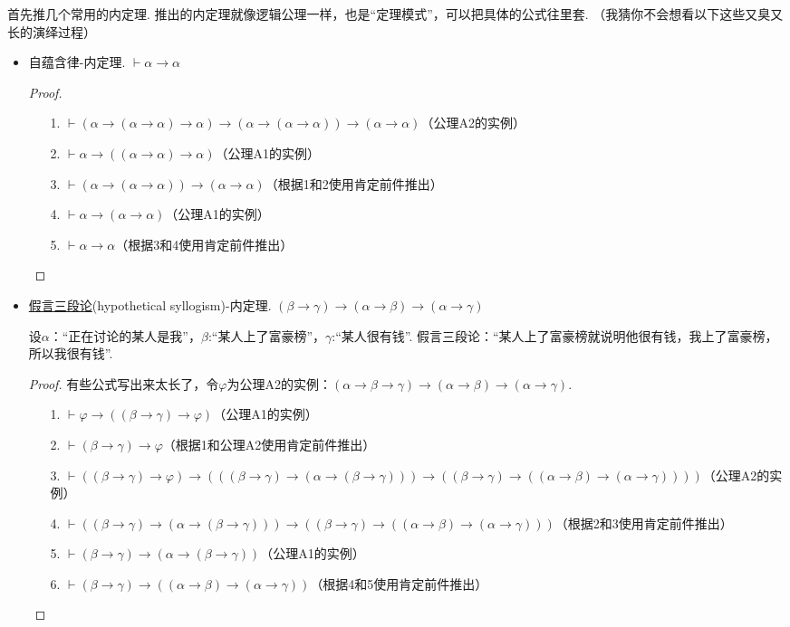\documentclass[main.tex]{subfiles}
\begin{document}
首先推几个常用的内定理. 推出的内定理就像逻辑公理一样，也是“定理模式”，可以把具体的公式往里套. （我猜你不会想看以下这些又臭又长的演绎过程）
\begin{itemize}

    \item 自蕴含律-内定理. \(\vdash \alpha \to \alpha\)
    \begin{proof}
        \begin{itemize}
            \item [1.] \(\vdash (\alpha \to (\alpha \to \alpha) \to \alpha) \to (\alpha \to (\alpha \to \alpha)) \to (\alpha \to \alpha)\)（公理A2的实例）
            \item [2.] \(\vdash \alpha \to ((\alpha \to \alpha) \to \alpha)\)（公理A1的实例）
            \item [3.] \(\vdash (\alpha \to (\alpha \to \alpha)) \to (\alpha \to \alpha)\)（根据1和2使用肯定前件推出）
            \item [4.] \(\vdash \alpha \to (\alpha \to \alpha)\)（公理A1的实例）
            \item [5.] \(\vdash \alpha \to \alpha\)（根据3和4使用肯定前件推出）
        \end{itemize}
    \end{proof}

    \item \uline{假言三段论}(hypothetical syllogism)-内定理. \((\beta \to \gamma) \to (\alpha \to \beta) \to (\alpha \to \gamma)\)
    \begin{note}
        设\(\alpha\)：“正在讨论的某人是我”，\(\beta\):“某人上了富豪榜”，\(\gamma\):“某人很有钱”. 假言三段论：“某人上了富豪榜就说明他很有钱，我上了富豪榜，所以我很有钱”.
    \end{note}
    \begin{proof}
        有些公式写出来太长了，令\(\varphi\)为公理A2的实例：\((\alpha \to \beta \to \gamma) \to (\alpha \to \beta) \to (\alpha \to \gamma)\).
        \begin{itemize}
            \item [1.] \(\vdash \varphi \to ((\beta \to \gamma) \to \varphi)\)（公理A1的实例）
            \item [2.] \(\vdash (\beta \to \gamma) \to \varphi\)（根据1和公理A2使用肯定前件推出）
            \item [3.] \(\vdash ((\beta \to \gamma) \to \varphi) \to (((\beta \to \gamma) \to (\alpha \to (\beta \to \gamma))) \to ((\beta \to \gamma) \to ((\alpha \to \beta) \to (\alpha \to \gamma))))\)（公理A2的实例）
            \item [4.] \(\vdash ((\beta \to \gamma) \to (\alpha \to (\beta \to \gamma))) \to ((\beta \to \gamma) \to ((\alpha \to \beta) \to (\alpha \to \gamma)))\)（根据2和3使用肯定前件推出）
            \item [5.] \(\vdash (\beta \to \gamma) \to (\alpha \to (\beta \to \gamma))\)（公理A1的实例）
            \item [6.] \(\vdash (\beta \to \gamma) \to ((\alpha \to \beta) \to (\alpha \to \gamma))\)（根据4和5使用肯定前件推出）
        \end{itemize}
    \end{proof}


\end{itemize}
\end{document}
